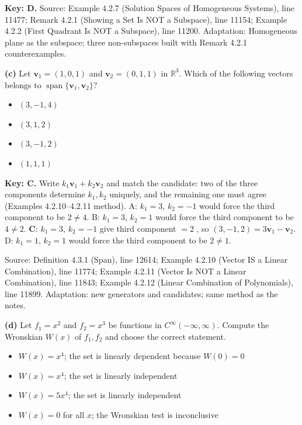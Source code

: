 \documentclass[11pt,a4paper]{article}
\newcommand{\Src}[1]{{\footnotesize\color{black!65}Source: #1}}
\begin{document}
\textbf{Key: D.} \Src{Example 4.2.7 (Solution Spaces of Homogeneous Systems), line 11477; Remark 4.2.1 (Showing a Set Is NOT a Subspace), line 11154; Example 4.2.2 (First Quadrant Is NOT a Subspace), line 11200. Adaptation: Homogeneous plane as the subspace; three non-subspaces built with Remark 4.2.1 counterexamples.}\par
{}\textbf{(c)} Let $\mathbf{v}_1=(1,0,1)$ and $\mathbf{v}_2=(0,1,1)$ in $\mathbb{R}^3$. Which of the following vectors belongs to $\operatorname{span}\{\mathbf{v}_1,\mathbf{v}_2\}$?\par
\begin{itemize}[leftmargin=8mm,itemsep=0pt]\item[A] $(3,-1,4)$\item[B] $(3,1,2)$\item[C$^{\ast}$] $(3,-1,2)$\item[D] $(1,1,1)$\end{itemize}
\textbf{Key: C.} Write $k_1\mathbf{v}_1+k_2\mathbf{v}_2$ and match the candidate: two of the three components determine $k_1,k_2$ uniquely, and the remaining one must agree (Examples 4.2.10--4.2.11 method). A: $k_1=3$, $k_2=-1$ would force the third component to be $2\neq4$. B: $k_1=3$, $k_2=1$ would force the third component to be $4\neq2$. \textbf{C}: $k_1=3$, $k_2=-1$ give third component $=2$ \checkmark, so $(3,-1,2)=3\mathbf{v}_1-\mathbf{v}_2$. D: $k_1=1$, $k_2=1$ would force the third component to be $2\neq1$.\par
\Src{Definition 4.3.1 (Span), line 12614; Example 4.2.10 (Vector IS a Linear Combination), line 11774; Example 4.2.11 (Vector Is NOT a Linear Combination), line 11843; Example 4.2.12 (Linear Combination of Polynomials), line 11899. Adaptation: new generators and candidates; same method as the notes.}\par
{}\textbf{(d)} Let $f_1=x^{2}$ and $f_2=x^{3}$ be functions in $C^{\infty}(-\infty,\infty)$. Compute the Wronskian $W(x)$ of $f_1,f_2$ and choose the correct statement.\par
\begin{itemize}[leftmargin=8mm,itemsep=0pt]\item[A] $W(x)=x^{4}$; the set is linearly dependent because $W(0)=0$\item[B$^{\ast}$] $W(x)=x^{4}$; the set is linearly independent\item[C] $W(x)=5x^{4}$; the set is linearly independent\item[D] $W(x)=0$ for all $x$; the Wronskian test is inconclusive\end{itemize}
\end{document}
